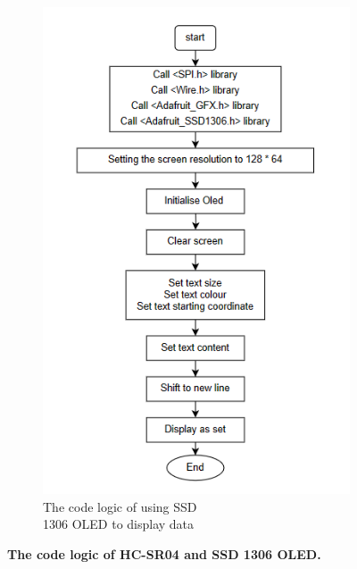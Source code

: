 \begin{landscape}
\begin{figure}[H]
\begin{subfigure}{0.52\textwidth}
            \includegraphics[width=\linewidth]{Image/Design/code_logic_display.png}
            \caption{\centering The code logic of using SSD \\1306 OLED to display data}
            \label{fig:cl_oled}
        \end{subfigure}
        \caption[The code logic of HC-SR04 and SSD 1306 OLED]
        {\centering \textbf{The code logic of HC-SR04 and SSD 1306 OLED.}}
        \label{fig:cl_tof_oled}
    \end{figure}
\end{landscape}


\newpage